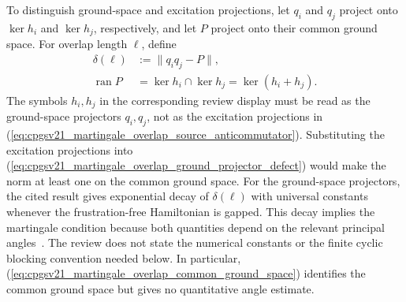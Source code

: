 \documentclass{article}
\begin{document}
To distinguish ground-space and excitation projections, let $q_i$ and $q_j$
project onto $\ker h_i$ and $\ker h_j$, respectively, and let $P$ project onto
their common ground space. For overlap length $\ell$, define
\begin{align}
    \delta(\ell)
     & :=\lVert q_iq_j-P\rVert,
    \label{eq:cpgsv21_martingale_overlap_ground_projector_defect} \\
    \operatorname{ran}P
     & =\ker h_i\cap\ker h_j
    =\ker(h_i+h_j).
    \label{eq:cpgsv21_martingale_overlap_common_ground_space}
\end{align}
The symbols $h_i,h_j$ in the corresponding review display must be read as the
ground-space projectors $q_i,q_j$, not as the excitation projections in
(\ref{eq:cpgsv21_martingale_overlap_source_anticommutator}). Substituting the
excitation projections into
(\ref{eq:cpgsv21_martingale_overlap_ground_projector_defect}) would make the
norm at least one on the common ground space. For the ground-space projectors,
the cited result gives exponential decay of $\delta(\ell)$ with universal
constants whenever the frustration-free Hamiltonian is gapped. This decay
implies the martingale condition because both quantities depend on the
relevant principal angles~\cite{Kastoryano2018Martingale}. The review does not
state the numerical constants or the finite cyclic blocking convention needed
below. In particular,
(\ref{eq:cpgsv21_martingale_overlap_common_ground_space}) identifies the
common ground space but gives no quantitative angle estimate.
\end{document}
